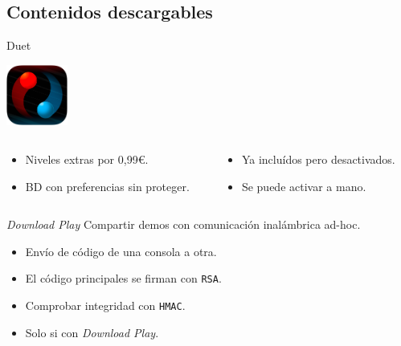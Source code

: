 \subsection{Contenidos descargables}
\begin{frame}{Duet}
\begin{center}\includegraphics[width=0.15\textwidth,keepaspectratio]{imgs/duet_logo.png}\end{center}

\begin{columns}
    \begin{column}{0.5\textwidth}
    \begin{itemize}
        \item<2-> Niveles extras por 0,99€.
        \item<4-> BD con preferencias sin proteger.
    \end{itemize}
    \end{column}

    \begin{column}{0.5\textwidth}
    \begin{itemize}
        \item<3-> Ya incluídos pero desactivados.
        \item<5-> Se puede activar a mano.
    \end{itemize}
    \end{column}
\end{columns}


\end{frame}

\begin{frame}{\textit{Download Play}}
Compartir demos con comunicación inalámbrica ad-hoc.
\vfill
{}
\begin{itemize}
    \item<3-> Envío de código de una consola a otra.
    \item<4-> El código principales se firman con \texttt{RSA}.
\end{itemize}
\vfill
{}
\begin{itemize}
    \item<6-> Comprobar integridad con \texttt{HMAC}.
    \item<7-> Solo si con \textit{Download Play}.
\end{itemize}
\end{frame}
